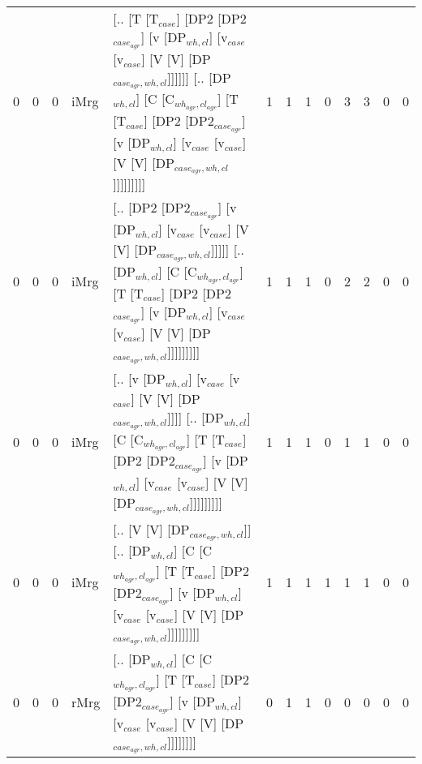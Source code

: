 \begin{tabularx}{\linewidth}{rrrlXrrrrrrrr}
   0 &       0 &   0 & iMrg & [.. [T [T$_{case}$] [DP2 [DP2$_{case_{agr}}$] [v [DP$_{wh,cl}$] [v$_{case}$ [v$_{case}$] [V [V] [DP$_{case_{agr},wh,cl}$]]]]]] [.. [DP$_{wh,cl}$] [C [C$_{wh_{agr},cl_{agr}}$] [T [T$_{case}$] [DP2 [DP2$_{case_{agr}}$] [v [DP$_{wh,cl}$] [v$_{case}$ [v$_{case}$] [V [V] [DP$_{case_{agr},wh,cl}$]]]]]]]]]                       &            1 &             1 &             1 &                  0 &           3 &           3 &                0 &              0 \\
   0 &       0 &   0 & iMrg & [.. [DP2 [DP2$_{case_{agr}}$] [v [DP$_{wh,cl}$] [v$_{case}$ [v$_{case}$] [V [V] [DP$_{case_{agr},wh,cl}$]]]]] [.. [DP$_{wh,cl}$] [C [C$_{wh_{agr},cl_{agr}}$] [T [T$_{case}$] [DP2 [DP2$_{case_{agr}}$] [v [DP$_{wh,cl}$] [v$_{case}$ [v$_{case}$] [V [V] [DP$_{case_{agr},wh,cl}$]]]]]]]]]                                    &            1 &             1 &             1 &                  0 &           2 &           2 &                0 &              0 \\
   0 &       0 &   0 & iMrg & [.. [v [DP$_{wh,cl}$] [v$_{case}$ [v$_{case}$] [V [V] [DP$_{case_{agr},wh,cl}$]]]] [.. [DP$_{wh,cl}$] [C [C$_{wh_{agr},cl_{agr}}$] [T [T$_{case}$] [DP2 [DP2$_{case_{agr}}$] [v [DP$_{wh,cl}$] [v$_{case}$ [v$_{case}$] [V [V] [DP$_{case_{agr},wh,cl}$]]]]]]]]]                                                         &            1 &             1 &             1 &                  0 &           1 &           1 &                0 &              0 \\
   0 &       0 &   0 & iMrg & [.. [V [V] [DP$_{case_{agr},wh,cl}$]] [.. [DP$_{wh,cl}$] [C [C$_{wh_{agr},cl_{agr}}$] [T [T$_{case}$] [DP2 [DP2$_{case_{agr}}$] [v [DP$_{wh,cl}$] [v$_{case}$ [v$_{case}$] [V [V] [DP$_{case_{agr},wh,cl}$]]]]]]]]]                                                                                          &            1 &             1 &             1 &                  1 &           1 &           1 &                0 &              0 \\
   0 &       0 &   0 & rMrg & [.. [DP$_{wh,cl}$] [C [C$_{wh_{agr},cl_{agr}}$] [T [T$_{case}$] [DP2 [DP2$_{case_{agr}}$] [v [DP$_{wh,cl}$] [v$_{case}$ [v$_{case}$] [V [V] [DP$_{case_{agr},wh,cl}$]]]]]]]]                                                                                                                           &            0 &             1 &             1 &                  0 &           0 &           0 &                0 &              0 \\
\hline
\end{tabularx}\endgroup\\
